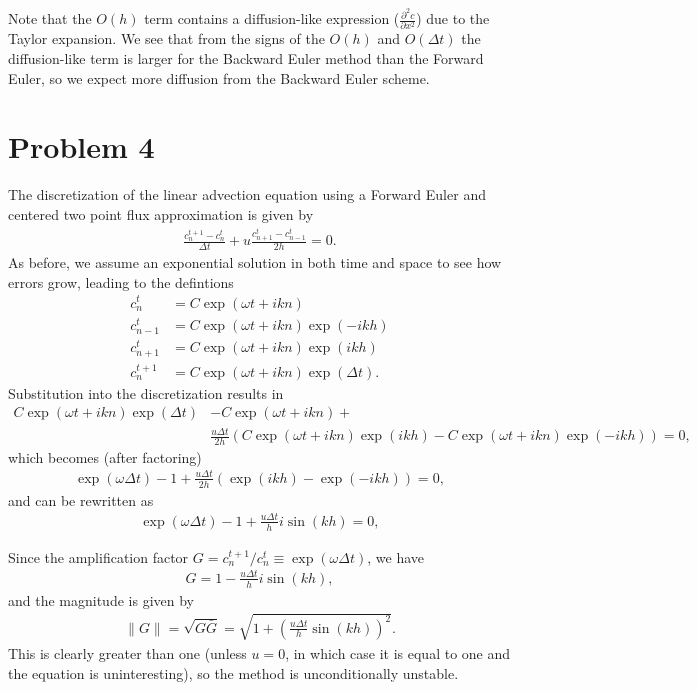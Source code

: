 \documentclass{article}
\begin{document}
Note that the $O(h)$ term contains a diffusion-like expression ($\frac{\partial^2 c}{\partial x^2}$) due to the Taylor expansion.
We see that from the signs of the $O(h)$ and $O(\Delta t)$ the diffusion-like term is larger for the Backward Euler method than the Forward Euler, so we expect more diffusion from the Backward Euler scheme.

\section{Problem 4}
The discretization of the linear advection equation using a Forward Euler and centered two point flux approximation is given by
\begin{align}
    \frac{c^{t+1}_n - c^t_n}{\Delta t} + u \frac{c^{t}_{n+1} - c^{t}_{n-1}}{2h} = 0.
\end{align}
As before, we assume an exponential solution in both time and space to see how errors grow, leading to the defintions
\begin{align}
    c^{t}_{n} &= C \exp(\omega t+ikn) \\
    c^{t}_{n-1} &= C \exp(\omega t+ikn) \exp(-ikh) \\
    c^{t}_{n+1} &= C \exp(\omega t+ikn) \exp(ikh)\\
    c^{t+1}_{n} &= C \exp(\omega t+ikn) \exp(\Delta t).
\end{align}
Substitution into the discretization results in
\begin{align*}
C \exp(\omega t+ikn) \exp(\Delta t) &- C \exp(\omega t+ikn) + \\
    & \frac{u \Delta t}{2h} (C \exp(\omega t+ikn) \exp(ikh) - C \exp(\omega t+ikn) \exp(-ikh)) = 0,
\end{align*}
which becomes (after factoring)
\begin{align}
\exp(\omega \Delta t) - 1 + \frac{u \Delta t}{2h} (\exp(ikh) - \exp(-ikh)) = 0,
\end{align}
and can be rewritten as
\begin{align}
\exp(\omega \Delta t) - 1 + \frac{u \Delta t}{h} i \sin(kh) = 0,
\end{align}

Since the amplification factor $G = c^{t+1}_n / c^{t}_{n} \equiv \exp(\omega \Delta t)$, we have
\begin{align}
    G = 1 - \frac{u \Delta t}{h} i \sin(kh),
\end{align}
and the magnitude is given by
\begin{align}
    \| G \| = \sqrt{G \bar{G}} = \sqrt{1 + \left( \frac{u \Delta t}{h} \sin(kh) \right)^2}.
\end{align}
This is clearly greater than one (unless $u = 0$, in which case it is equal to one and the equation is uninteresting), so the method is unconditionally unstable.
\end{document}
